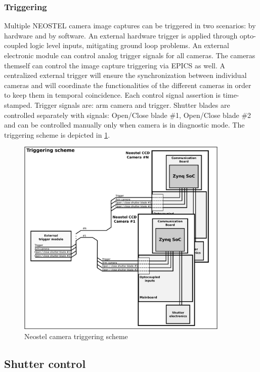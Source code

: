 \subsubsection{Triggering}
Multiple NEOSTEL camera image captures can be triggered in two scenarios: by hardware and by software. An external hardware trigger is applied through opto-coupled logic level inputs, mitigating ground loop problems. An external electronic module can control analog trigger signals for all cameras. The cameras themself can control the image capture triggering via EPICS as well. A centralized external trigger will ensure the synchronization between individual cameras and will coordinate the functionalities of the different cameras in order to keep them in temporal coincidence. Each control signal assertion is time-stamped. Trigger signals are: arm camera and trigger. Shutter blades are controlled separately with signals: Open/Close blade \#1, Open/Close blade \#2 and can be controlled manually only when camera is in diagnostic mode.  The triggering scheme is depicted in \ref{fig:triggering}.

\begin{figure}[H]
\centering
\includegraphics[width=0.9\textwidth]{pict/triggering.png}
\caption{Neostel camera triggering scheme}
\label{fig:triggering}
\end{figure}
 
\subsection{Shutter control}
\label{sec:shutctrl}

